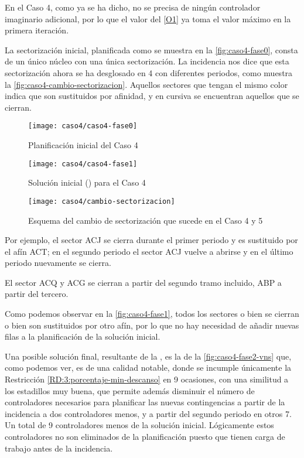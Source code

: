 En el Caso 4, como ya se ha dicho, no se precisa de ningún controlador imaginario adicional, por lo que el valor del \ref{O1} ya toma el valor máximo en la primera iteración.

La sectorización inicial, planificada como se muestra en la \autoref{fig:caso4-fase0}, consta de un único núcleo con una única sectorización. La incidencia nos dice que esta sectorización ahora se ha desglosado en 4 con diferentes periodos, como muestra la \autoref{fig:caso4-cambio-sectorizacion}. Aquellos sectores que tengan el mismo color indica que son sustituidos por afinidad, y en cursiva se encuentran aquellos que se cierran.

\begin{figure}[!]
	\centering
	\texttt{[image: caso4/caso4-fase0]}
	\caption{Planificación inicial del Caso 4}
	\label{fig:caso4-fase0}
\end{figure}

\begin{figure}[!]
	\centering
	\texttt{[image: caso4/caso4-fase1]}
	\caption{Solución inicial (\faseuno{}) para el Caso 4}
	\label{fig:caso4-fase1}
\end{figure}

\begin{figure}[!]
	\centering
	\texttt{[image: caso4/cambio-sectorizacion]}
	\caption{Esquema del cambio de sectorización que sucede en el Caso 4 y 5}
	\label{fig:caso4-cambio-sectorizacion}
\end{figure}

Por ejemplo, el sector ACJ se cierra durante el primer periodo y es sustituido por el afín ACT; en el segundo periodo el sector ACJ vuelve a abrirse y en el último periodo nuevamente se cierra. 

El sector ACQ y ACG se cierran a partir del segundo tramo incluido, ABP a partir del tercero.

Como podemos observar en la \autoref{fig:caso4-fase1}, todos los sectores o bien se cierran o bien son sustituidos por otro afín, por lo que no hay necesidad de añadir nuevas filas a la planificación de la solución inicial.

Una posible solución final, resultante de la \fasedos{}, es la de la \autoref{fig:caso4-fase2-vns} que, como podemos ver, es de una calidad notable, donde se incumple únicamente la Restricción \ref{RD:3:porcentaje-min-descanso} en 9 ocasiones, con una similitud a los estadillos muy buena, que permite además disminuir el número de controladores necesarios para planificar las nuevas contingencias a partir de la incidencia a dos controladores menos, y a partir del segundo periodo en otros 7. Un total de 9 controladores menos de la solución inicial. Lógicamente estos controladores no son eliminados de la planificación puesto que tienen carga de trabajo antes de la incidencia.

